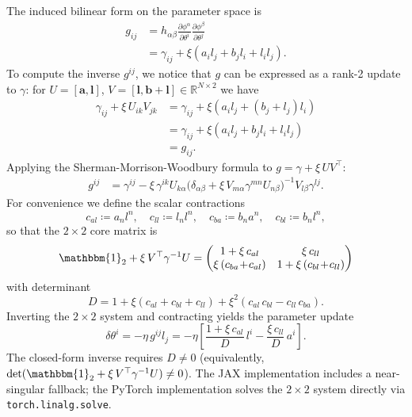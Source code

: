 \documentclass{article}
\newcommand{\Id}{\mathbbm{1}}
\newcommand{\vecb}[1]{\boldsymbol{#1}}
\begin{document}
\medskip\noindent
The induced bilinear form on the parameter space is
\begin{align*}
    g_{ij}
    &= h_{\alpha\beta} \frac{\partial \phi^\alpha}{\partial \theta^i} \frac{\partial \phi^\beta}{\partial \theta^j} \\
    &= \gamma_{ij} + \xi\!\left(a_i l_j + b_j l_i + l_i l_j\right).
\end{align*}
To compute the inverse $g^{ij}$, we notice that $g$ can be expressed as a rank-2 update to $\gamma$:
for $U=[\vecb{a}, \vecb{l}]$, $V=[\vecb{l}, \vecb{b} + \vecb{l}]\in\mathbb{R}^{N\times 2}$ we have
\begin{align*}
    \gamma_{ij} + \xi\,U_{ik} V_{jk}
    &= \gamma_{ij} + \xi\!\left(a_i l_j + (b_j + l_j) l_i\right) \\
    &= \gamma_{ij} + \xi\!\left(a_i l_j + b_j l_i + l_i l_j\right) \\
    &= g_{ij}.
\end{align*}
Applying the Sherman-Morrison-Woodbury formula to $g = \gamma + \xi\,UV^\top$:
\begin{align*}
    g^{ij}
    &= \gamma^{ij} - \xi\,\gamma^{ik} U_{k\alpha} \Big(\delta_{\alpha\beta} + \xi\,V_{m\alpha} \gamma^{mn} U_{n\beta}\Big)^{-1} V_{l\beta} \gamma^{lj}.
\end{align*}
For convenience we define the scalar contractions $$
    c_{al} \coloneqq a_n l^n,\quad
    c_{ll} \coloneqq l_n l^n,\quad
    c_{ba} \coloneqq b_n a^n,\quad
    c_{bl} \coloneqq b_n l^n,
$$ so that the $2\times 2$ core matrix is $$
    \Id_2 + \xi\,V^\top\gamma^{-1}U
    = \begin{pmatrix}
            1 + \xi\,c_{al} & \xi\,c_{ll} \\
            \xi\,(c_{ba}\!+\!c_{al}) & 1 + \xi\,(c_{bl}\!+\!c_{ll})
       \end{pmatrix}
$$ with determinant
\begin{equation}\label{eq:offdiag-det}
    D
    = 1 + \xi\!\left(c_{al} + c_{bl} + c_{ll}\right) + \xi^2\!\left(c_{al}\,c_{bl} - c_{ll}\,c_{ba}\right).
\end{equation}
Inverting the $2\times 2$ system and contracting yields the parameter update
\begin{equation}\label{eq:offdiag-update}
    \delta\theta^i
    = -\eta\, g^{ij} l_j
    = -\eta\left[ \frac{1 + \xi\,c_{al}}{D}\,l^i - \frac{\xi\,c_{ll}}{D}\,a^i \right].
\end{equation}
The closed-form inverse requires $D\neq 0$
(equivalently, $\det(\Id_2 + \xi\,V^\top\gamma^{-1}U)\neq 0$).
The JAX implementation includes a near-singular fallback;
the PyTorch implementation solves the $2\times 2$ system directly via
\texttt{torch.linalg.solve}.
\end{document}
